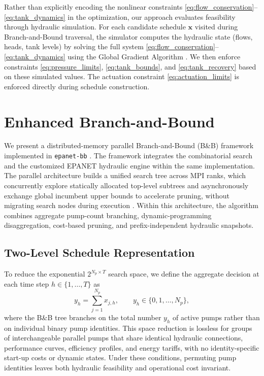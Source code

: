 \documentclass[Journal,letterpaper,InsideFigs]{ascelike-new}
\begin{document}
Rather than explicitly encoding the nonlinear constraints \eqref{eq:flow_conservation}--\eqref{eq:tank_dynamics} in the optimization, our approach evaluates feasibility through hydraulic simulation. For each candidate schedule $\mathbf{x}$ visited during Branch-and-Bound traversal, the simulator computes the hydraulic state (flows, heads, tank levels) by solving the full system \eqref{eq:flow_conservation}--\eqref{eq:tank_dynamics} using the Global Gradient Algorithm \cite{Todini1988}. We then enforce constraints \eqref{eq:pressure_limits}, \eqref{eq:tank_bounds}, and \eqref{eq:tank_recovery} based on these simulated values. The actuation constraint \eqref{eq:actuation_limits} is enforced directly during schedule construction.

\section{Enhanced Branch-and-Bound}
\label{sec:algorithm}

We present a distributed-memory parallel Branch-and-Bound (B\&B) framework implemented in \texttt{epanet-bb} \cite{epanetbb}. The framework integrates the combinatorial search and the customized EPANET hydraulic engine within the same implementation. The parallel architecture builds a unified search tree across MPI ranks, which concurrently explore statically allocated top-level subtrees and asynchronously exchange global incumbent upper bounds to accelerate pruning, without migrating search nodes during execution \cite{Gendron1994}. Within this architecture, the algorithm combines aggregate pump-count branching, dynamic-programming disaggregation, cost-based pruning, and prefix-independent hydraulic snapshots.

\subsection{Two-Level Schedule Representation}

To reduce the exponential $2^{N_p \times T}$ search space, we define the aggregate decision at each time step $h \in \{1, \ldots, T\}$ as
\[
	y_h = \sum_{j=1}^{N_p} x_{j,h},
	\qquad y_h \in \{0, 1, \ldots, N_p\},
\]
where the B\&B tree branches on the total number $y_h$ of active pumps rather than on individual binary pump identities. This space reduction is lossless for groups of interchangeable parallel pumps that share identical hydraulic connections, performance curves, efficiency profiles, and energy tariffs, with no identity-specific start-up costs or dynamic states. Under these conditions, permuting pump identities leaves both hydraulic feasibility and operational cost invariant.
\end{document}
